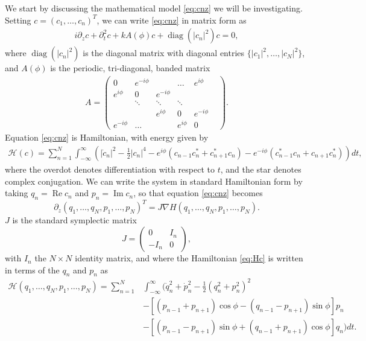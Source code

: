\documentclass[11pt,reqno]{amsart}
\def\calH{{\mathcal H}}
\DeclareMathOperator{\diag}{diag}
\DeclareMathOperator{\RR}{Re}
\DeclareMathOperator{\II}{Im}
\begin{document}
We start by discussing the mathematical model \cref{eq:cnz} we will be investigating. Setting $c = (c_1, \dots, c_n)^T$, we can write \cref{eq:cnz} in matrix form as
\begin{align}\label{eq:cz}
i \partial_z c + \partial_t^2 c + k A(\phi) c + \diag\left(|c_n|^2\right)c = 0,
\end{align}
where $\diag\left(|c_n|^2\right)$ is the diagonal matrix with diagonal entries $\{|c_1|^2, \dots, |c_N|^2\}$, and $A(\phi)$ is the periodic, tri-diagonal, banded matrix
\begin{align}
A = \begin{pmatrix}
0 & e^{-i \phi} & & \dots & e^{i \phi} \\
e^{i \phi} & 0 & e^{-i \phi} & & & \\
& \ddots & \ddots & \ddots &  & \\
 & &e^{i \phi}  & 0 & e^{-i \phi}  \\
e^{-i \phi}& \dots & & e^{i \phi} & 0
\end{pmatrix}.
\end{align}
Equation \cref{eq:cnz} is Hamiltonian, with energy given by
\begin{align}\label{eq:Hc}
\calH(c) = \sum_{n=1}^N \int_{-\infty}^\infty 
\left(
|\dot{c}_n|^2 - \frac{1}{2}|c_n|^4 - e^{i\phi}( c_{n-1}c_n^* + c_{n+1}^* c_n) 
- e^{-i \phi}( c_{n-1}^*c_n + c_{n+1} c_n^*) \right) dt,
\end{align}
where the overdot denotes differentiation with respect to $t$, and the star denotes complex conjugation. We can write the system in standard Hamiltonian form by taking $q_n = \RR c_n$ and $p_n = \II c_n$, so that equation \cref{eq:cnz} becomes
\begin{equation}
\partial_z (q_1, \dots, q_N, p_1, \dots, p_N)^T
 = J \nabla H(q_1, \dots, q_N, p_1, \dots, p_N).
\end{equation}
$J$ is the standard symplectic matrix
\[
J = \begin{pmatrix}
0 & I_n \\ -I_n & 0
\end{pmatrix},
\]
with $I_n$ the $N \times N$ identity matrix, and where the Hamiltonian \cref{eq:Hc} is written in terms of the $q_n$ and $p_n$ as
\begin{equation}\label{eq:Hqp}
\begin{aligned}
\calH(q_1, \dots, q_N, p_1, \dots, p_N) = \sum_{n=1}^N &\int_{-\infty}^\infty 
\Big(
\dot{q}_n^2 + \dot{p}_n^2 - \frac{1}{2}(q_n^2 + p_n^2)^2 \\
&- \left[(p_{n-1} + p_{n+1}) \cos\phi - (q_{n-1} - p_{n+1}) \sin \phi\right] p_n \\
&- \left[(p_{n-1} - p_{n+1}) \sin\phi + (q_{n-1} + p_{n+1}) \cos \phi\right] q_n
\Big) dt.
\end{aligned}
\end{equation}
\end{document}
